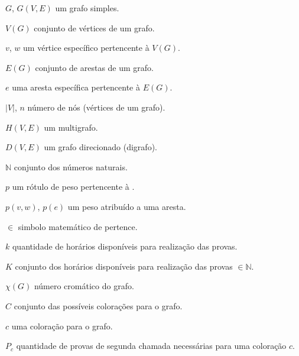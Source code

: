 \begin{simbolos}
  \item[$G$, $G(V, E)$] um grafo simples.
  \item[$V(G)$] conjunto de vértices de um grafo.
  \item[$v$, $w$] um vértice específico pertencente à $V(G)$.
  \item[$E(G)$] conjunto de arestas de um grafo.
  \item[$e$] uma aresta específica pertencente à $E(G)$.
  \item[$|V|$,  $n$] número de nós (vértices de um grafo).
  \item[$H(V, E)$] um multigrafo. 
  \item[$D(V, E)$] um grafo direcionado (digrafo).
  \item[$\mathbb{N}$] conjunto dos números naturais.
  \item[$p$] um rótulo de peso pertencente à .
  \item[$p(v, w)$, $p(e)$] um peso atribuído a uma aresta.
  \item[$\in$] simbolo matemático de pertence.
  \item[$k$] quantidade de horários disponíveis para realização das provas.
  \item[$K$] conjunto dos horários disponíveis para realização das provas $\in \mathbb{N}$.
  \item[$\chi(G)$] número cromático do grafo.
  \item[$C$] conjunto das possíveis colorações para o grafo.
  \item[$c$] uma coloração para o grafo.
  \item[$P_c$] quantidade de provas de segunda chamada necessárias para uma coloração $c$.
\end{simbolos}